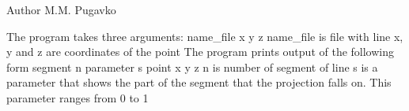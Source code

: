 \begin{DoxyAuthor}{Author}
M.\+M. Pugavko
\end{DoxyAuthor}
The program takes three arguments\+: name\+\_\+file x y z name\+\_\+file is file with line x, y and z are coordinates of the point The program prints output of the following form segment n parameter s point x y z n is number of segment of line s is a parameter that shows the part of the segment that the projection falls on. This parameter ranges from 0 to 1 